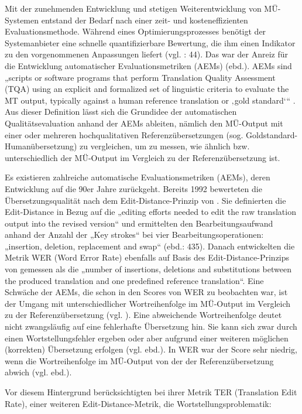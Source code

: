 Mit der zunehmenden Entwicklung und stetigen Weiterentwicklung von MÜ-Systemen entstand der Bedarf nach einer zeit- und kosteneffizienten Evaluationsmethode. Während eines Optimierungsprozesses benötigt der Systemanbieter eine schnelle quantifizierbare Bewertung, die ihm einen Indikator zu den vorgenommenen Anpassungen liefert (vgl. \citealt{Doherty2012}: 44). Das war der Anreiz für die Entwicklung automatischer Evaluationsmetriken (AEMs) (ebd.). AEMs sind „scripts or software programs that perform Translation Quality Assessment (TQA) using an explicit and formalized set of linguistic criteria to evaluate the MT output, typically against a human reference translation or ‚gold standard‘“ \citep[4]{Doherty2017}. Aus dieser Definition lässt sich die Grundidee der automatischen Qualitätsevaluation anhand der AEMs ableiten, nämlich den MÜ-Output mit einer oder mehreren hochqualitativen Referenzübersetzungen (sog. Goldstandard-Humanübersetzung) zu vergleichen, um zu messen, wie ähnlich bzw. unterschiedlich der MÜ-Output im Vergleich zu der Referenzübersetzung ist.

Es existieren zahlreiche automatische Evaluationsmetriken (AEMs), deren Entwicklung auf die 90er Jahre zurückgeht. Bereits 1992 bewerteten \citet{SuEtAl1992} die Übersetzungsqualität nach dem Edit-Distance-Prinzip von \citet{Levenshtein1966}. Sie definierten die Edit-Distance in Bezug auf die „editing efforts needed to edit the raw translation output into the revised version“ und ermittelten den Bearbeitungsaufwand anhand der Anzahl der „Key strokes“ bei vier Bearbeitungsoperationen: „insertion, deletion, replacement and swap“ (ebd.: 435). Danach entwickelten \citet{NießenEtAl2000} die Metrik WER (Word Error Rate) ebenfalls auf Basis des Edit-Distance-Prinzips von \citet[707]{Levenshtein1966} gemessen als die „number of insertions, deletions and substitutions between the produced translation and one predefined reference translation“. Eine Schwäche der AEMs, die schon in den Scores von WER zu beobachten war, ist der Umgang mit unterschiedlicher Wortreihenfolge im MÜ-Output im Vergleich zu der Referenzübersetzung (vgl. \citealt{HanEtAl2017}). Eine abweichende Wortreihenfolge deutet nicht zwangsläufig auf eine fehlerhafte Übersetzung hin. Sie kann sich zwar durch einen Wortstellungsfehler ergeben oder aber aufgrund einer weiteren möglichen (korrekten) Übersetzung erfolgen (vgl. ebd.). In WER war der Score sehr niedrig, wenn die Wortreihenfolge im MÜ-Output von der der Referenzübersetzung abwich (vgl. ebd.).

Vor diesem Hintergrund berücksichtigten \citet{SnoverEtAl2006} bei ihrer Metrik TER (Translation Edit Rate), einer weiteren Edit-Distance-Metrik, die Wortstellungsproblematik:

